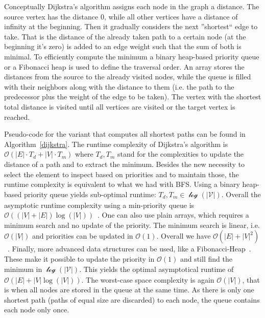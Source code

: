             Conceptually Dijkstra's algorithm assigns each node in the graph a distance. 
            The source vertex has the distance 0, while all other vertices have a distance of infinity at the beginning.
            Then it gradually considers the next ''shortest`` edge to take.
            That is the distance of the already taken path to a certain node (at the beginning it's zero) is added to an edge weight such that the sum of both is minimal. 
            To efficiently compute the minimum a binary heap-based priority queue or a Fibonacci heap is used to define the traversal order. 
            An array stores the distances from the source to the already visited nodes, while the queue is filled with their neighbors along with the distance to them (i.e. the path to the predecessor plus the weight of the edge to be taken). 
            The vertex with the shortest total distance is visited until all vertices are visited or the target vertex is reached.
            
            Pseudo-code for the variant that computes all shortest paths can be found in Algorithm~\ref{dijkstra}. 
            The runtime complexity of Dijkstra's algorithm is $\mathcal{O}(|E| \cdot T_d + |V| \cdot T_m)$ where $T_d, T_m$ stand for the complexities to update the distance of a path and to extract the minimum.
            Besides the new necessity to select the element to inspect based on priorities and to maintain those, the runtime complexity is equivalent to what we had with BFS.        
            Using a binary heap-based priority queue yields sub-optimal runtime:
            $T_d, T_m \in \mathcal{\log(|V|)}$. 
            Overall the asymptotic runtime complexity using a min-priority queue is $\mathcal{O}((|V| + |E|)\log(|V|))$~\autocite{Goodrich2014AlgorithmDA}.        
            One can also use plain arrays, which requires a minimum search and no update of the priority. 
            The minimum search is linear, i.e. $\mathcal{O}(|V|)$ and priorities can be updated in $\mathcal{O}(1)$. 
            Overall we have $\mathcal{O}(|E| + |V|^2)$~\autocite{Goodrich2014AlgorithmDA}.        
            Finally, more advanced data structures can be used, like a Fibonacci-Heap~\autocite{cormen2009introduction}. 
            These make it possible to update the priority in $\mathcal{O}(1)$ and still find the minimum in $\mathcal{\log(|V|)}$. 
            This yields the optimal asymptotical runtime of $\mathcal{O}(|E| + |V|\log(|V|))$. 
            The worst-case space complexity is again $\mathcal{O}(|V|)$, that is when all nodes are stored in the queue at the same time. 
            As there is only one shortest path (paths of equal size are discarded) to each node, the queue contains each node only once.
            
